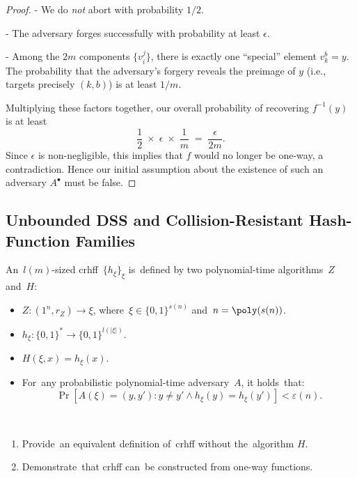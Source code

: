 \begin{proof}
  - We do \emph{not} abort with probability \(1/2\).

  - The adversary forges successfully with probability at least \(\epsilon\).

  - Among the \(2m\) components \(\{v_{i}^j\}\), there is exactly one “special” element \(v_{k}^{b} = y\). The probability that the adversary’s forgery reveals the preimage of \(y\) (i.e., targets precisely \((k,b)\)) is at least \(1/m\).

  Multiplying these factors together, our overall probability of recovering \(f^{-1}(y)\) is at least
  \[
    \frac{1}{2} \;\times\; \epsilon \;\times\; \frac{1}{m} 
    \;=\; \frac{\epsilon}{2m}.
  \]
  Since \(\epsilon\) is non-negligible, this implies that \(f\) would no longer be one-way, a contradiction. Hence our initial assumption about the existence of such an adversary \(A^\bullet\) must be false.
\end{proof}

\subsection{Unbounded DSS and Collision-Resistant Hash-Function Families}

\begin{definition}
    An~$l(m)$-sized crhff~$\{h_{\xi}\}_{\xi}$ is~defined by two polynomial-time algorithms~$Z$ and~$H$:
    \begin{itemize}
        \item $Z \colon (1^{n}, r_Z) \to \xi$, where~$\xi \in \{0, 1\}^{s(n)}$ and~$n = \poly(s(n))$.
        \item $h_{\xi} \colon \{0, 1\}^{*} \to \{0, 1\}^{l(|\xi|)}$.
        \item $H(\xi, x) = h_\xi(x)$.
        \item For~any probabilistic polynomial-time adversary~$A$, it holds~that:
            \[
                \Pr\left[A(\xi) = (y, y') \colon y \neq y' \wedge h_{\xi}(y) = h_{\xi}(y')\right] < \varepsilon(n).
            \]
    \end{itemize}
\end{definition}

\begin{exercise} ~
    \begin{enumerate}
        \item Provide~an equivalent definition of~crhff without the~algorithm $H$.
        \item Demonstrate~that crhff can~be constructed from one-way functions.
    \end{enumerate}
\end{exercise}

